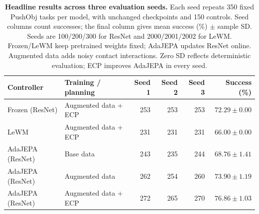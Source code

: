 \begin{table}[t]
\centering
\caption{\textbf{Headline results across three evaluation seeds.} Each seed repeats 350 fixed PushObj tasks per model, with unchanged checkpoints and 150 controls. Seed columns count successes; the final column gives mean success (\%) $\pm$ sample SD. Seeds are 100/200/300 for ResNet and 2000/2001/2002 for LeWM. Frozen/LeWM keep pretrained weights fixed; AdaJEPA updates ResNet online. Augmented data adds noisy contact interactions. Zero SD reflects deterministic evaluation; ECP improves AdaJEPA in every seed.}
\label{tab:eval-seeds}
\small
\begin{tabular*}{\textwidth}{@{\extracolsep{\fill}}llrrrr@{}}
\toprule
Controller & Training / planning & Seed 1 & Seed 2 & Seed 3 & Success (\%)\\
\midrule
Frozen (ResNet) & Augmented data + ECP & 253 & 253 & 253 & $72.29\pm0.00$\\
LeWM & Augmented data + ECP & 231 & 231 & 231 & $66.00\pm0.00$\\
\midrule
AdaJEPA (ResNet) & Base data & 243 & 235 & 244 & $68.76\pm1.41$\\
AdaJEPA (ResNet) & Augmented data & 262 & 254 & 260 & $73.90\pm1.19$\\
AdaJEPA (ResNet) & Augmented data + ECP & 272 & 265 & 270 & $76.86\pm1.03$\\
\bottomrule
\end{tabular*}
\end{table}
